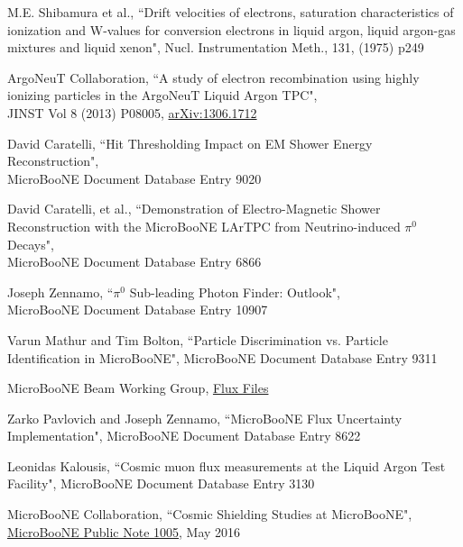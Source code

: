 \begin{thebibliography}{20}
 M.E. Shibamura et al., ``Drift velocities of electrons, saturation characteristics of ionization
and W-values for conversion electrons in liquid argon, liquid argon-gas mixtures and liquid
xenon", Nucl. Instrumentation Meth., 131, (1975) p249

  ArgoNeuT Collaboration, ``A study of electron recombination using highly ionizing particles in the ArgoNeuT Liquid Argon TPC",\\
  JINST Vol 8 (2013) P08005, \href{http://arxiv.org/abs/1306.1712}{arXiv:1306.1712}
  
  David Caratelli, ``Hit Thresholding Impact on EM Shower Energy Reconstruction",\\ MicroBooNE Document Database Entry 9020

  David Caratelli, et al., ``Demonstration of Electro-Magnetic Shower Reconstruction with
the MicroBooNE LArTPC from Neutrino-induced $\pi^0$ Decays",\\ MicroBooNE Document Database Entry 6866
  
  Joseph Zennamo, ``$\pi^0$ Sub-leading Photon Finder: Outlook",\\
  MicroBooNE Document Database Entry 10907
 
  
  Varun Mathur and Tim Bolton, ``Particle Discrimination vs. Particle Identification in MicroBooNE", MicroBooNE Document Database Entry 9311 

  MicroBooNE Beam Working Group,
  \href{https://cdcvs.fnal.gov/redmine/projects/ubooneoffline/wiki/Flux\_Histograms}{Flux Files}

  Zarko Pavlovich and Joseph Zennamo, ``MicroBooNE Flux Uncertainty Implementation", MicroBooNE Document Database Entry 8622

Leonidas Kalousis, ``Cosmic muon flux measurements at the Liquid Argon Test Facility", MicroBooNE Document Database Entry 3130 

MicroBooNE Collaboration, ``Cosmic Shielding Studies at MicroBooNE",\\
 \href{http://microboone.fnal.gov/wp-content/uploads/MICROBOONE-NOTE-1005-PUB.pdf}{MicroBooNE Public Note 1005}, May 2016


\end{thebibliography}
